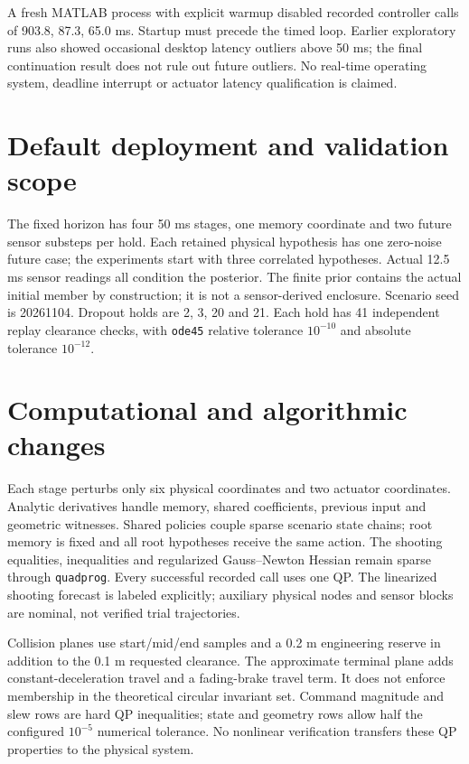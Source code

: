 \documentclass[11pt]{article}
\begin{document}
A fresh MATLAB process with explicit warmup disabled recorded controller calls
of 903.8, 87.3, 65.0 ms. Startup must precede the timed loop. Earlier exploratory
runs also showed occasional desktop latency outliers above 50 ms; the
final continuation result does not rule out future outliers. No real-time operating
system, deadline interrupt or actuator latency qualification is claimed.

\section*{Default deployment and validation scope}
The fixed horizon has four 50 ms stages, one memory coordinate and two future
sensor substeps per hold. Each retained physical hypothesis has one zero-noise
future case; the experiments start with three correlated hypotheses. Actual
12.5 ms sensor readings all condition the posterior. The finite prior contains
the actual initial member by construction; it is not a sensor-derived enclosure.
Scenario seed is 20261104. Dropout holds are 2, 3, 20 and 21. Each hold has 41
independent replay clearance checks, with \texttt{ode45} relative tolerance
$10^{-10}$ and absolute tolerance $10^{-12}$.

\section*{Computational and algorithmic changes}
Each stage perturbs only six physical coordinates and two actuator coordinates.
Analytic derivatives handle memory, shared coefficients, previous input and
geometric witnesses. Shared policies couple sparse scenario state chains;
root memory is fixed and all root hypotheses receive the same action. The
shooting equalities, inequalities and regularized Gauss--Newton Hessian remain
sparse through \texttt{quadprog}. Every successful recorded call uses one QP.
The linearized shooting forecast is labeled explicitly; auxiliary physical
nodes and sensor blocks are nominal, not verified trial trajectories.

Collision planes use start/mid/end samples and a 0.2 m engineering reserve in
addition to the 0.1 m requested clearance. The approximate terminal plane adds
constant-deceleration travel and a fading-brake travel term. It does not enforce
membership in the theoretical circular invariant set. Command magnitude and
slew rows are hard QP inequalities; state and geometry rows allow half the
configured $10^{-5}$ numerical tolerance. No nonlinear verification transfers
these QP properties to the physical system.
\end{document}
